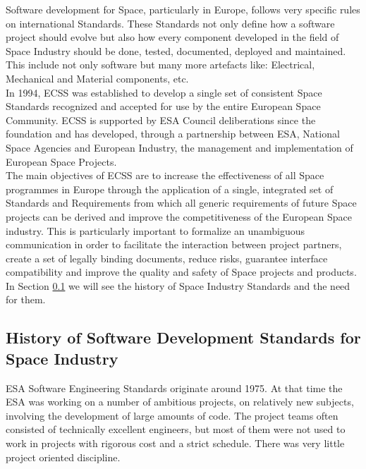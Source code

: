 Software development for Space, particularly in Europe, follows very specific rules on international Standards. These Standards not only define how a software project should
evolve but also how every component developed in the field of Space Industry should be done, tested, documented, deployed and maintained.
This include not only software but many more artefacts like: Electrical, Mechanical and Material components, etc.\\
In 1994, \ac{ECSS} was established to develop a single set of consistent Space Standards recognized and accepted for use by the entire European Space Community.
\ac{ECSS} is supported by \ac{ESA} Council deliberations since the foundation and has developed, through
a partnership between \ac{ESA}, National Space Agencies and European Industry, the management and implementation of European Space Projects.\\
The main objectives of \ac{ECSS} are to increase the effectiveness of all Space programmes in Europe through the application of a
single, integrated set of Standards and Requirements from which all generic requirements of future Space projects can be derived and
improve the competitiveness of the European Space industry.
This is particularly important to formalize an unambiguous communication in order to facilitate the interaction between project partners,
create a set of legally binding documents, reduce risks, guarantee interface compatibility and
improve the quality and safety of Space projects and products.\\
In Section \ref{sec:historyspace} we will see the history of Space Industry Standards and the need for them.

\subsection{History of Software Development Standards for Space Industry}\label{sec:historyspace}
\ac{ESA} Software Engineering Standards originate around 1975. At
that time the \ac{ESA} was working on a number of ambitious projects, on relatively new subjects, involving the development of
large amounts of code. The project teams often consisted of technically excellent engineers, but most of them were not used to work in projects with
rigorous cost and a strict schedule. There was very little project oriented discipline\cite{esa-bulletin-90}.\\

